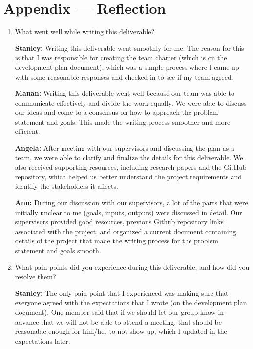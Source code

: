 \documentclass{article}
\begin{document}
\newpage{}

\section*{Appendix --- Reflection}

\begin{enumerate}
    \item What went well while writing this deliverable? 
    
\textbf{Stanley:} Writing this deliverable went smoothly for me. The reason for this is that I was responsible for creating the team charter (which is on the development plan document), which was a simple process where I came up with some reasonable responses and checked in to see if my team agreed.

\textbf{Manan:} Writing this deliverable went well because our team was able to communicate effectively and divide the work equally. We were able to discuss our ideas and come to a consensus on how to approach the problem statement and goals. This made the writing process smoother and more efficient.

\textbf{Angela:} After meeting with our supervisors and discussing the plan as a team, we were able to clarify and finalize the details for this deliverable. We also received supporting resources, including research papers and the GitHub repository, which helped us better understand the project requirements and identify the stakeholders it affects.

\textbf{Ann:} During our discussion with our supervisors, a lot of the parts that were initially unclear to me (goals, inputs, outputs) were discussed in detail. Our supervisors provided good resources, previous Github repository links associated with the project, and organized a current document containing details of the project that made the writing process for the problem statement and goals smooth. 


    \item What pain points did you experience during this deliverable, and how
    did you resolve them?

\textbf{Stanley:} The only pain point that I experienced was making sure that everyone agreed with the expectations that I wrote (on the development plan document). One member said that if we should let our group know in advance that we will not be able to attend a meeting, that should be reasonable enough for him/her to not show up, which I updated in the expectations later.  


\end{enumerate}
\end{document}

